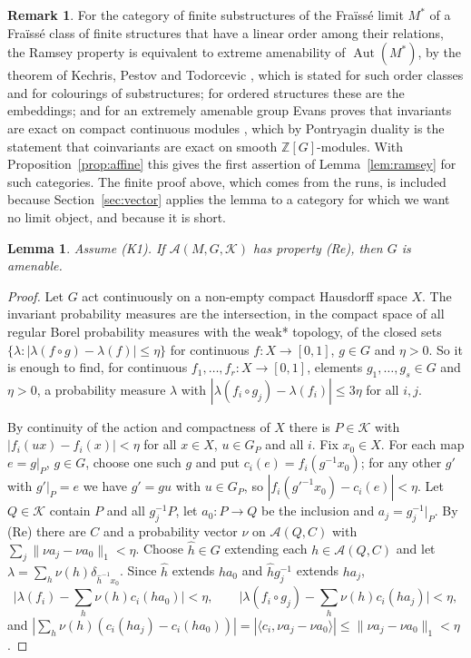 \documentclass[11pt,a4paper]{article}
\newtheorem{lemma}[theorem]{Lemma}
\theoremstyle{definition}
\newtheorem{remark}[theorem]{Remark}
\newcommand{\A}{\mathcal{A}}
\newcommand{\K}{\mathcal{K}}
\newcommand{\Z}{\mathbb{Z}}
\newcommand{\Aut}{\operatorname{Aut}}
\begin{document}
\begin{remark}\label{rem:evans}
For the category of finite substructures of the Fra\"iss\'e limit $M^*$ of a Fra\"iss\'e class of finite structures that have a linear order among their relations, the Ramsey property is equivalent to extreme amenability of $\Aut(M^*)$, by the theorem of Kechris, Pestov and Todorcevic \cite[Theorem~4.8]{KPT}, which is stated for such order classes and for colourings of substructures; for ordered structures these are the embeddings; and for an extremely amenable group Evans proves
that invariants are exact on compact continuous modules
\cite[Lemma~3.7\,(i)]{Ev}, which by Pontryagin duality is the statement that
coinvariants are exact on smooth $\Z[G]$-modules. With
Proposition~\ref{prop:affine} this gives the first assertion of
Lemma~\ref{lem:ramsey} for such categories. The finite proof above, which
comes from the runs, is included because Section~\ref{sec:vector} applies
the lemma to a category for which we want no limit object, and because it
is short.
\end{remark}

\begin{lemma}\label{lem:Re}
Assume \textup{(K1)}. If $\A(M,G,\K)$ has property \textup{(Re)}, then $G$
is amenable.
\end{lemma}

\begin{proof}
Let $G$ act continuously on a non-empty compact Hausdorff space $X$. The
invariant probability measures are the intersection, in the compact space
of all regular Borel probability measures with the weak* topology, of the closed
sets $\{\lambda:|\lambda(f\circ g)-\lambda(f)|\le\eta\}$ for continuous
$f\colon X\to[0,1]$, $g\in G$ and $\eta>0$. So it is enough to find, for
continuous $f_1,\dots,f_r\colon X\to[0,1]$, elements $g_1,\dots,g_s\in G$ and
$\eta>0$, a probability measure $\lambda$ with
$|\lambda(f_i\circ g_j)-\lambda(f_i)|\le3\eta$ for all $i,j$.

By continuity of the action and compactness of $X$ there is $P\in\K$ with
$|f_i(ux)-f_i(x)|<\eta$ for all $x\in X$, $u\in G_P$ and all $i$. Fix
$x_0\in X$. For each map $e=g|_P$, $g\in G$, choose one such $g$ and put
$c_i(e)=f_i(g^{-1}x_0)$; for any other $g'$ with $g'|_P=e$ we have
$g'=gu$ with $u\in G_P$, so $|f_i(g'^{-1}x_0)-c_i(e)|<\eta$. Let $Q\in\K$
contain $P$ and all $g_j^{-1}P$, let $a_0\colon P\to Q$ be the inclusion and
$a_j=g_j^{-1}|_P$. By \textup{(Re)} there are $C$ and a probability vector
$\nu$ on $\A(Q,C)$ with $\sum_j\|\nu a_j-\nu a_0\|_1<\eta$. Choose
$\hat h\in G$ extending each $h\in\A(Q,C)$ and let
$\lambda=\sum_h\nu(h)\delta_{\hat h^{-1}x_0}$. Since $\hat h$ extends $ha_0$
and $\hat hg_j^{-1}$ extends $ha_j$,
\[
 \bigl|\lambda(f_i)-\textstyle\sum_h\nu(h)c_i(ha_0)\bigr|<\eta,\qquad
 \bigl|\lambda(f_i\circ g_j)-\textstyle\sum_h\nu(h)c_i(ha_j)\bigr|<\eta ,
\]
and $|\sum_h\nu(h)(c_i(ha_j)-c_i(ha_0))|=|\langle c_i,\nu a_j-\nu
a_0\rangle|\le\|\nu a_j-\nu a_0\|_1<\eta$.
\end{proof}
\end{document}
